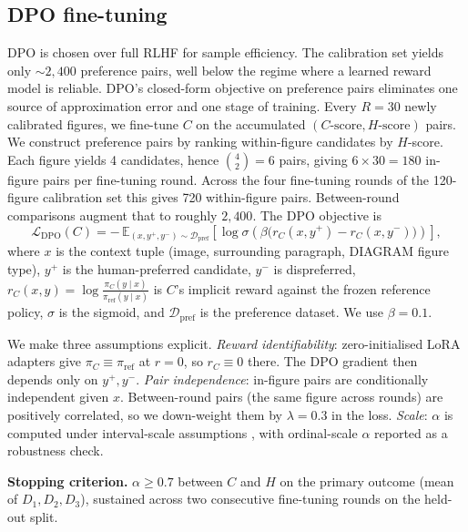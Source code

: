 \documentclass[pdflatex,sn-mathphys-num]{sn-jnl}
\begin{document}
\subsection{DPO fine-tuning}\label{subsec:dpo}

DPO is chosen over full RLHF for sample efficiency. The calibration set yields only $\sim 2{,}400$ preference pairs, well below the regime where a learned reward model is reliable. DPO's closed-form objective on preference pairs eliminates one source of approximation error and one stage of training. Every $R = 30$ newly calibrated figures, we fine-tune $C$ on the accumulated $(C\text{-score}, H\text{-score})$ pairs. We construct preference pairs by ranking within-figure candidates by $H$-score. Each figure yields 4 candidates, hence $\binom{4}{2} = 6$ pairs, giving $6 \times 30 = 180$ in-figure pairs per fine-tuning round. Across the four fine-tuning rounds of the 120-figure calibration set this gives 720 within-figure pairs. Between-round comparisons augment that to roughly $2{,}400$. The DPO objective \cite{rafailov2023dpo} is
\begin{equation}
\mathcal{L}_{\mathrm{DPO}}(C) = -\,\mathbb{E}_{(x,y^+,y^-)\sim \mathcal{D}_{\mathrm{pref}}}\!\left[ \log \sigma\!\left( \beta \bigl( r_C(x,y^+) - r_C(x,y^-) \bigr) \right) \right],
\label{eq:dpo}
\end{equation}
where $x$ is the context tuple (image, surrounding paragraph, DIAGRAM figure type), $y^+$ is the human-preferred candidate, $y^-$ is dispreferred, $r_C(x,y) = \log \frac{\pi_C(y\mid x)}{\pi_{\mathrm{ref}}(y\mid x)}$ is $C$'s implicit reward against the frozen reference policy, $\sigma$ is the sigmoid, and $\mathcal{D}_{\mathrm{pref}}$ is the preference dataset. We use $\beta = 0.1$.

We make three assumptions explicit. \emph{Reward identifiability}: zero-initialised LoRA adapters give $\pi_C \equiv \pi_{\mathrm{ref}}$ at $r=0$, so $r_C \equiv 0$ there. The DPO gradient then depends only on $y^+, y^-$. \emph{Pair independence}: in-figure pairs are conditionally independent given $x$. Between-round pairs (the same figure across rounds) are positively correlated, so we down-weight them by $\lambda = 0.3$ in the loss. \emph{Scale}: $\alpha$ is computed under interval-scale assumptions \cite{hayes2007krippendorff}, with ordinal-scale $\alpha$ reported as a robustness check.

\textbf{Stopping criterion.} $\alpha \geq 0.7$ between $C$ and $H$ on the primary outcome (mean of $D_1, D_2, D_3$), sustained across two consecutive fine-tuning rounds on the held-out split.
\end{document}
